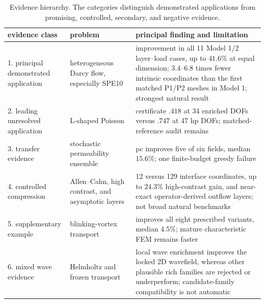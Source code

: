 \documentclass[11pt]{article}
\numberwithin{algorithm}{section}
\theoremstyle{definition}\newtheorem{definition}[theorem]{Definition}
\theoremstyle{remark}\newtheorem{remark}[theorem]{Remark}
\begin{document}
\secondarynumericsA
\begin{table}[h]
\centering
\caption{Evidence hierarchy.  The categories distinguish demonstrated
applications from promising, controlled, secondary, and negative evidence.}
\begin{tabular}{p{}p{}p{}}
\toprule
evidence class & problem & principal finding and limitation\\
\midrule
1. principal demonstrated application & heterogeneous Darcy flow, especially
SPE10 & improvement in all 11 Model 1/2 layer--load cases, up to $41.6\%$ at
equal dimension; $3.4$--$6.8$ times fewer intrinsic coordinates than the first
matched P1/P2 meshes in Model 1; strongest natural result\\
2. leading unresolved application & L-shaped Poisson & certificate $.418$ at
34 enriched DOFs versus $.747$ at 47 hp DOFs; matched-reference audit remains\\
3. transfer evidence & stochastic permeability ensemble & pc improves five of
six fields, median $15.6\%$; one finite-budget greedy failure\\
4. controlled compression & Allen--Cahn, high contrast, and asymptotic layers
& 12 versus 129 interface coordinates, up to $24.3\%$ high-contrast gain, and
near-exact operator-derived outflow layers; not broad natural benchmarks\\
5. supplementary example & blinking-vortex transport & improves all eight
prescribed variants, median $4.5\%$; mature characteristic FEM remains faster\\
6. mixed wave evidence & Helmholtz and frozen transport & local wave enrichment
improves the locked 2D wavefield, whereas other plausible rich families are
rejected or underperform; candidate-family compatibility is not automatic\\
\bottomrule
\end{tabular}
\label{tab:evidence-hierarchy}
\end{table}
\end{document}
